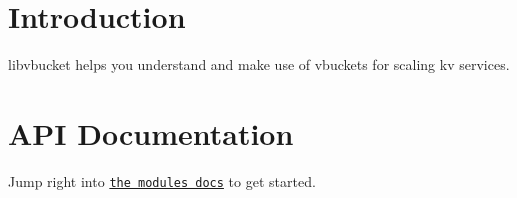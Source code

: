 \hypertarget{index_intro_sec}{}\section{Introduction}\label{index_intro_sec}
libvbucket helps you understand and make use of vbuckets for scaling kv services.\hypertarget{index_docs_sec}{}\section{API Documentation}\label{index_docs_sec}
Jump right into \href{modules.html}{\tt the modules docs} to get started. 